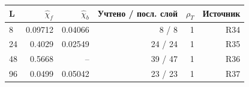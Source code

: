 \begin{tabular}{lrrrrr}
\toprule
L & $\hat\chi_f$ & $\hat\chi_b$ & Учтено / посл. слой & $\rho_T$ & Источник \\
\midrule
8 & 0.09712 & 0.04066 & 8 / 8 & 1 & R34 \\
24 & 0.4029 & 0.02549 & 24 / 24 & 1 & R35 \\
48 & 0.5668 & -- & 39 / 47 & 1 & R36 \\
96 & 0.0499 & 0.05042 & 23 / 23 & 1 & R37 \\
\bottomrule
\end{tabular}